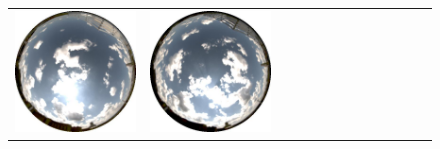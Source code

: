 \begin{figure}
\begin{tabular}{@{}rcccccccccccc@{}}
    \includegraphics[width=\customwidth]{./figures/database/20130824_130014.jpg} &
    \includegraphics[width=\customwidth]{./figures/database/20130824_133006.jpg} &

\end{tabular}
\end{figure}
